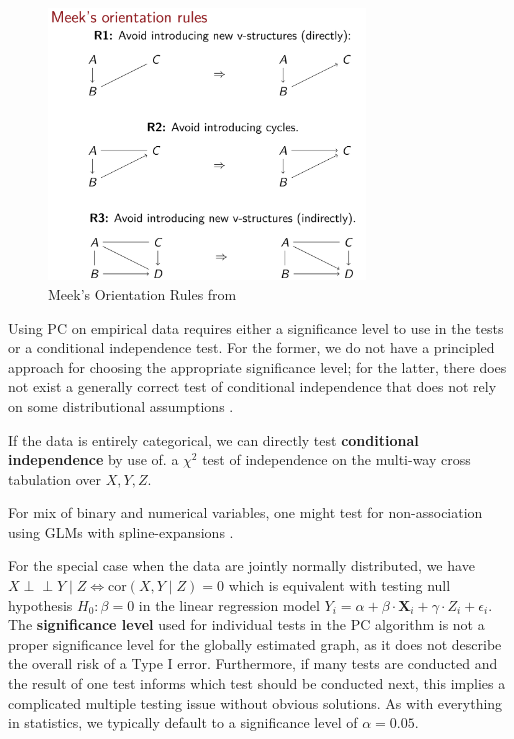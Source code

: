 \documentclass{article}
\newcommand{\indep}{\perp\!\!\!\!\perp}
\newcommand{\X}{\mathbf{X}}
\begin{document}
	\begin{figure}[H]
		\centering
		\includegraphics[width=0.75\textwidth]{Meek's Orientation Rules} 
		\caption{Meek's Orientation Rules from \cite{petersen2024}}
		\label{fig:meeks_orientation}
	\end{figure}
	
	Using PC on empirical data requires either a significance level to use in the tests or a conditional independence test. For the former, we do not have a principled approach for choosing the appropriate significance level; for the latter, there does not exist a generally correct test of conditional independence that does not rely on some distributional assumptions \cite{shah2020}.
		
	If the data is entirely categorical, we can directly test \textbf{conditional independence} by use of. a $\chi^2$ test of independence on the multi-way cross tabulation over $X, Y, Z$.
	
	For mix of binary and numerical variables, one might test
	for non-association using GLMs with spline-expansions \cite{petersen2021}.
	
	For the special case when the data are jointly normally distributed, we have $X \indep Y \mid Z \Leftrightarrow \text{cor}(X, Y \mid Z) = 0$ which is equivalent with testing null hypothesis $H_0 : \beta = 0$ in the linear regression model $Y_i = \alpha + \beta \cdot \X_i + \gamma \cdot Z_i + \epsilon_i$. \\
	
	The \textbf{significance level} used for individual tests in the PC algorithm is not a proper significance level for the globally estimated graph, as it does not describe the overall risk of a Type I error. Furthermore, if many tests are conducted and the result of one test informs which test should be conducted next, this implies a complicated multiple testing issue without obvious solutions. As with everything in statistics, we typically default to a significance level of $\alpha = 0.05$.
	 
\end{document}
